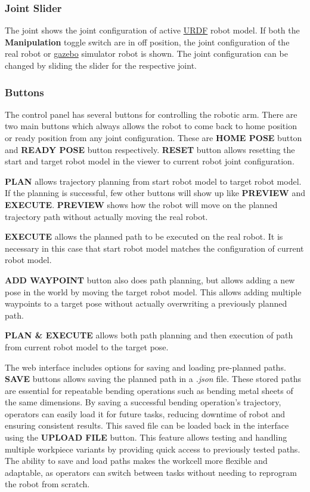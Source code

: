\subsubsection{Joint Slider}
\label{subsubsec:web-ui-joint-slider}
The joint shows the joint configuration of active \hyperref[acro:URDF]{URDF} robot model. If both the \textbf{Manipulation} toggle switch are in off position, the joint configuration of the real robot or \hyperref[acro:Gazebo]{gazebo} simulator robot is shown. The joint configuration can be changed by sliding the slider for the respective joint.

\subsubsection{Buttons}
\label{subsubsec:web-ui-buttons}
The control panel has several buttons for controlling the robotic arm. There are two main buttons which always allows the robot to come back to home position or ready position from any joint configuration. These are \textbf{HOME POSE} button and \textbf{READY POSE} button respectively. \textbf{RESET} button allows resetting the start and target robot model in the viewer to current robot joint configuration.

\textbf{PLAN} allows trajectory planning from start robot model to target robot model. If the planning is successful, few other buttons will show up like \textbf{PREVIEW} and \textbf{EXECUTE}. \textbf{PREVIEW} shows how the robot will move on the planned trajectory path without actually moving the real robot. 

\textbf{EXECUTE} allows the planned path to be executed on the real robot. It is necessary in this case that start robot model matches the configuration of current robot model.

\textbf{ADD WAYPOINT} button also does path planning, but allows adding a new pose in the world by moving the target robot model. This allows adding multiple waypoints to a target pose without actually overwriting a previously planned path.

\textbf{PLAN \& EXECUTE} allows both path planning and then execution of path from current robot model to the target pose.

\vspace{\baselineskip}
The web interface includes options for saving and loading pre-planned paths. \textbf{SAVE} buttons allows saving the planned path in a \textit{.json} file. 
These stored paths are essential for repeatable bending operations such as bending metal sheets of the same dimensions. By saving a successful bending operation's trajectory, operators can easily load it for future tasks, reducing downtime of robot and ensuring consistent results. This saved file can be loaded back in the interface using the \textbf{UPLOAD FILE} button. This feature allows testing and handling multiple workpiece variants by providing quick access to previously tested paths. The ability to save and load paths makes the workcell more flexible and adaptable, as operators can switch between tasks without needing to reprogram the robot from scratch.


